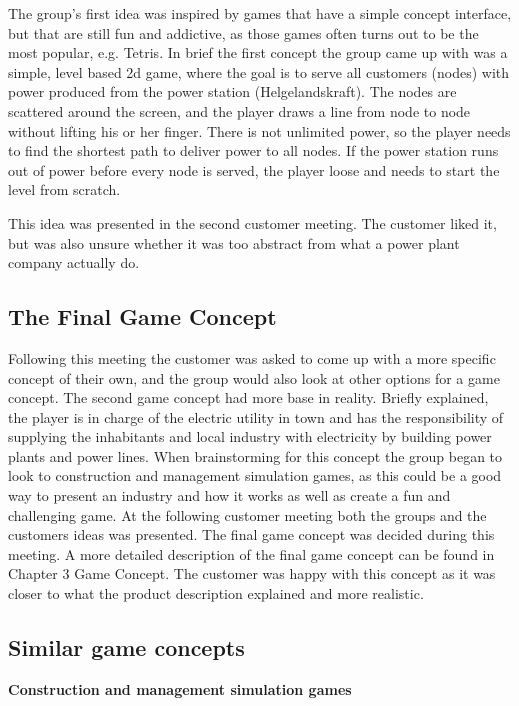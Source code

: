 The group's first idea was inspired by games that have a simple concept interface, but that are still fun and addictive, as those games often turns out to be the most popular, e.g. Tetris. In brief the first concept the group came up with was a simple, level based 2d game, where the goal is to serve all customers (nodes) with power produced from the power station
(Helgelandskraft). The nodes are scattered around the screen, and the player draws a line from node to node without lifting his or her finger. There is not unlimited power, so the player needs to find the shortest path to deliver
power to all nodes. If the power station runs out of power before every node is served, the player loose and needs to start the level from scratch.

This idea was presented in the second customer meeting. The customer liked it, but was also unsure whether it was too abstract from what a power plant company actually do. 

\subsection{The Final Game Concept}

Following this meeting the customer was asked to come up with a more specific concept of their own, and the group would also look at other options for a game concept. The second game concept had more base in reality. Briefly explained, the player is in charge of the electric utility in town and has the responsibility of supplying the inhabitants and local industry with electricity by building power plants and power lines. When brainstorming for this concept the group began to look to construction and management simulation games, as this could be a good way to present an industry and how it works as well as create a fun and challenging game. At the following customer meeting both the groups and the customers ideas was presented. The final game concept was decided during this meeting. A more detailed description of the final game concept can be found in Chapter 3 Game Concept. The customer was happy with this concept as it was closer to what the product description explained and more realistic.

\subsection{Similar game concepts}

{\bf Construction and management simulation games}


